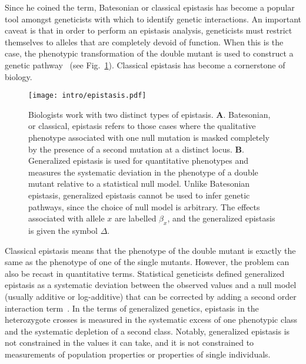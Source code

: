 Since he coined the term, Batesonian or classical epistasis has become a popular
tool amongst geneticists with which to identify genetic interactions. An
important caveat is that in order to perform an epistasis analysis, geneticists
must restrict themselves to alleles that are completely devoid of function. When
this is the case, the phenotypic transformation of the double mutant is
used to construct a genetic pathway~\citep{Avery1992,Huang2006} (see
Fig.~\ref{fig:epistasis_example}). Classical epistasis has become a cornerstone
of biology.

\begin{figure}
  \centering{}
  \texttt{[image: intro/epistasis.pdf]}
  \caption{Biologists work with two distinct types of epistasis.
  \textbf{A}. Batesonian, or classical, epistasis refers to those cases where
  the qualitative phenotype associated with one null mutation is masked
  completely by the presence of a second mutation at a distinct locus.
  \textbf{B}. Generalized epistasis is used for quantitative phenotypes and
  measures the systematic deviation in the phenotype of a double mutant relative
  to a statistical null model. Unlike Batesonian epistasis, generalized
  epistasis cannot be used to infer genetic pathways, since the choice of null
  model is arbitrary. The effects associated with allele \(x\) are labelled
  \(\beta_x\), and the generalized epistasis is given the symbol \(\Delta \).
  }\label{fig:epistasis_example}
\end{figure}

Classical epistasis means that the phenotype of the double mutant is exactly the
same as the phenotype of one of the single mutants. However, the problem can
also be recast in quantitative terms. Statistical geneticists defined
generalized epistasis as a systematic deviation between the observed values and
a null model (usually additive or log-additive) that can be corrected by adding
a second order interaction term~\citep{Fisher1919}. In the terms of generalized
genetics, epistasis in the heterozygote crosses is measured in the systematic
excess of one phenotypic class and the systematic depletion of a second class.
Notably, generalized epistasis is not constrained in the values it can take, and
it is not constrained to measurements of population properties or properties of
single individuals.

